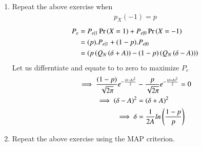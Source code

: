 \documentclass[journal,12pt,twocolumn]{IEEEtran}
\renewcommand\thesection{\arabic{section}}
\begin{document}
\begin{enumerate}[label=\thesection.\arabic*
,ref=\thesection.\theenumi]
\begin{align}
\end{align}
Let us differntiate and equate to to zero to maximize $P_{e}$
\begin{align}
\frac{d\brak{P_{e}}}{d\delta}&=\frac{d}{d\delta}\brak{1+Q_N\brak{\delta+A}-Q_N\brak{\delta-A}}\\
&= \frac{1}{\sqrt{2\pi}}e^{-\frac{\brak{\delta-A}^2}{2}}-\frac{1}{\sqrt{2\pi}}e^{-\frac{\brak{\delta+A}^2}{2}}\\
\implies \brak{\delta-A}^2 &=\brak{\delta+A}^2 \\
\implies \delta &=0
\end{align}
hence $\delta=0$ is where $P_e$ is at maximum.
\item Repeat the above exercise when 
	\begin{align}
		p_{X}(-1) = p
	\end{align}
	\solution
	\begin{align}
P_{e}&=P_{e|1}\Pr\left(X=1\right)+P_{e|0}\Pr\left(X=-1\right)\\
     &=(p).P_{e|1}+(1-p).P_{e|0}\\
     &=\left(p\left(Q_N\left(\delta+A\right)\right)-(1-p)\left(Q_N\left(\delta-A\right)\right)\right)
\end{align}
Let us differntiate and equate to to zero to maximize $P_{e}$
\begin{align}
 \implies \frac{(1-p)}{\sqrt{2\pi}}e^{-\frac{\left(\delta-A\right)^2}{2}}&-\frac{p}{\sqrt{2\pi}}e^{-\frac{\left(\delta+A\right)^2}{2}}=0\\
\implies \left(\delta-A\right)^2 &=\left(\delta+A\right)^2 \\
\implies \delta &=\frac{1}{2A}ln\left(\frac{1-p}{p}\right)
\end{align}
\item Repeat the above exercise using the MAP criterion.
		\end{enumerate}
\end{document}
